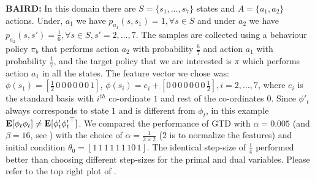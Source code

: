 \textbf{BAIRD:} In this domain there are $S=\{s_1,\ldots,s_7\}$ states and $A=\{a_1,a_2\}$ actions. Under, $a_1$ we have $p_{a_1}(s,s_1)=1, \forall s\in S$ and under $a_2$ we have $p_{a_2}(s,s')=\frac{1}{6}, \forall s\in S, s'=2,\ldots,7$. The samples are collected using a behaviour policy $\pi_b$ that performs action $a_2$ with probability $\frac{6}{7}$ and action $a_1$ with probability $\frac17$, and the target policy that we are interested is $\pi$ which performs action $a_1$ in all the states. The feature vector we chose was: $\phi(s_1)=[\frac{1}{2}\,0\,0\,0\,0\,0\,0\,1]$, $\phi(s_i)=e_i+[0\,0\,0\,0\,0\,0\,0\,\frac{1}{2}], i=2,\ldots,7$, where $e_i$ is the standard basis with $i^{th}$ co-ordinate $1$ and rest of the co-ordinates $0$. Since $\phi'_t$ always corresponds to state $1$ and is different from $\phi_t$, in this example $\mathbf{E}[{\phi_t\phi_t}]\neq\mathbf{E}[{\phi'_t{\phi'_t}^\top}]$.
We compared the performance of GTD with $\alpha=0.005$ (and $\beta=16$, see \cite{gtdmp}) with the choice of $\alpha=\frac{1}{2\times 2}$ ($2$ is to normalize the features) and initial condition $\theta_0=[1\, 1\, 1\, 1\, 1\, 1\, 10\, 1]$. The identical step-size of $\frac{1}{4}$ performed better than choosing different step-sizes for the primal and dual variables. Please refer to the top right plot of .

